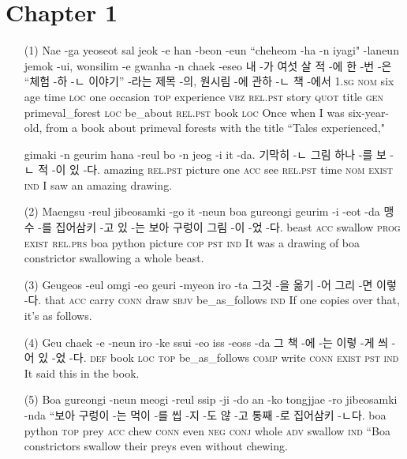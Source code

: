 \section*{Chapter 1}

\begin{itemize}
\item [(1)]
\tgl
		{Nae -ga yeoseot sal jeok -e han -beon -eun ``cheheom -ha -n iyagi" -laneun jemok -ui, wonsilim -e gwanha -n chaek -eseo}
		{내 -가 여섯 살 적 -에 한 -번 -은 ``체험 -하 -ㄴ 이야기” -라는 제목 -의, 원시림 -에 관하 -ㄴ 책 -에서}
		{\textsc{1.sg} \textsc{nom} six age time \textsc{loc} one occasion \textsc{top}	experience \textsc{vbz} \textsc{rel.pst} story \textsc{quot} title \textsc{gen} primeval\_forest \textsc{loc} be\_about \textsc{rel.pst} book \textsc{loc}}
		{Once when I was six-year-old, from a book about primeval forests with the title ``Tales experienced,"}
		
\tgl
		{gimaki -n geurim hana -reul bo -n jeog -i it -da.}
		{기막히 -ㄴ 그림 하나 -를 보 -ㄴ 적 -이 있 -다.}
		{amazing \textsc{rel.pst} picture one \textsc{acc} see \textsc{rel.pst} time \textsc{nom} \textsc{exist} \textsc{ind}}
		{I saw an amazing drawing.}

\item [(2)]
\tgl
		{Maengsu -reul jibeosamki -go it -neun boa gureongi geurim -i -eot -da}
		{맹수 -를 집어삼키 -고 있 -는 보아 구렁이 그림 -이 -었 -다.}
		{beast \textsc{acc} swallow \textsc{prog} \textsc{exist} \textsc{rel.prs} boa python picture \textsc{cop} \textsc{pst} \textsc{ind}}
		{It was a drawing of boa constrictor swallowing a whole beast.}

\item [(3)]
\tgl
		{Geugeos -eul omgi -eo geuri -myeon iro -ta}
		{그것 -을 옮기 -어 그리 -면 이렇 -다.}
		{that \textsc{acc} carry \textsc{conn} draw \textsc{sbjv} be\_as\_follows \textsc{ind}}
		{If one copies over that, it's as follows.}

\item [(4)]
\tgl
		{Geu chaek -e -neun iro -ke ssui -eo iss -eoss -da}
		{그 책 -에 -는 이렇 -게 씌 -어 있 -었 -다.}
		{\textsc{def} book \textsc{loc} \textsc{top} be\_as\_follows \textsc{comp} write \textsc{conn} \textsc{exist} \textsc{pst} \textsc{ind}}
		{It said this in the book.}

\item [(5)]
\tgl
		{Boa gureongi -neun meogi -reul ssip -ji -do an -ko tongjjae -ro jibeosamki -nda}
		{``보아 구렁이 -는 먹이 -를 씹 -지 -도 않 -고 통째 -로 집어삼키 -ㄴ다.}
		{boa python \textsc{top} prey \textsc{acc} chew \textsc{conn} even \textsc{neg} \textsc{conj} whole \textsc{adv} swallow \textsc{ind}}
		{``Boa constrictors swallow their preys even without chewing.}


\end{itemize}
